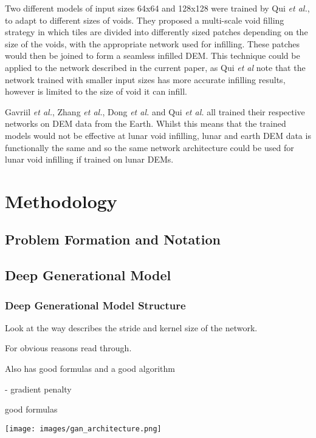 \documentclass[twocolumn]{article}
\begin{document}
Two different models of input sizes 64x64 and 128x128 were trained by Qui \emph{et al.}, to adapt to different sizes of voids.
They proposed a multi-scale void filling strategy in which tiles are divided into differently sized patches depending on the size of the voids, with the appropriate network used for infilling.
These patches would then be joined to form a seamless infilled DEM.
This technique could be applied to the network described in the current paper, as Qui \emph{et al} note that the network trained with smaller input sizes has more accurate infilling results, however is limited to the size of void it can infill.

Gavriil \emph{et al.}, Zhang \emph{et al.}, Dong \emph{et al.} and Qui \emph{et al.} all trained their respective networks on DEM data from the Earth.
Whilst this means that the trained models would not be effective at lunar void infilling, lunar and earth DEM data is functionally the same and so the same network architecture could be used for lunar void infilling if trained on lunar DEMs.


\section{Methodology}
\label{sec:orgbf9de64}

\subsection{Problem Formation and Notation}
\label{sec:org9aae4dd}
\subsection{Deep Generational Model}
\label{sec:orge35f821}
\subsubsection{Deep Generational Model Structure}
\label{sec:orgd0901f0}
Look at the way\autocite{zhangVoidFillingBased2020} describes the stride and kernel size of the network.

For obvious reasons read through\autocite{yuGenerativeImageInpainting2018}.

Also has good formulas and a good algorithm

\autocite{gulrajaniImprovedTrainingWasserstein2017} - gradient penalty

\autocite{qiuVoidFillingDigital2019} good formulas

\begin{figure*}
\centering
\texttt{[image: images/gan\_architecture.png]}
\end{figure*}
\end{document}
